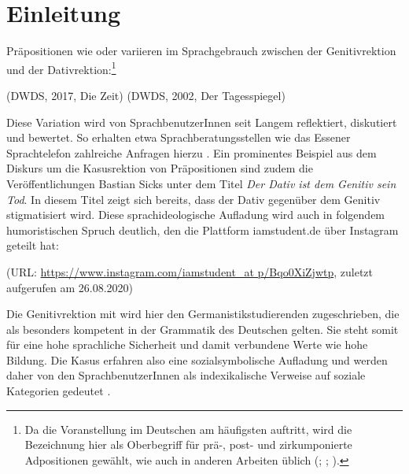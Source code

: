 \chapter{Einleitung}
Präpositionen wie \wegen{} oder \dank{} variieren im Sprachgebrauch zwischen der Genitivrektion und der Dativrektion:\footnote{Da die Voranstellung im Deutschen am häufigsten auftritt, wird die Bezeichnung  hier als Oberbegriff für prä-, post- und zirkumponierte Adpositionen gewählt, wie auch in anderen Arbeiten üblich (\citealp[vgl. etwa][629--630]{Griehaber2009}; \citealp[39]{Romare.2004}; \citealp[356]{Helbig.2017}).} 
\begin{exe}
\ex {} (DWDS, 2017, Die Zeit)
\ex {} (DWDS, 2002, Der Tagesspiegel)
\end{exe}
Diese Variation wird von SprachbenutzerInnen seit Langem reflektiert, diskutiert und bewertet. 
So erhalten etwa Sprachberatungsstellen wie das Essener Sprachtelefon zahlreiche Anfragen hierzu \citep[s.][121]{Bunting1996}. 
Ein prominentes Beispiel aus dem Diskurs um die Kasusrektion von Präpositionen sind zudem die Veröffentlichungen Bastian Sicks unter dem Titel \textit{Der Dativ ist dem Genitiv sein Tod}. 
In diesem Titel zeigt sich bereits, dass der Dativ gegenüber dem Genitiv stigmatisiert wird. 
Diese sprachideologische Aufladung wird auch in folgendem humoristischen Spruch deutlich, den die Plattform iamstudent.de über Instagram geteilt hat:
\begin{exe}
\ex {} (URL: \url{https://www.instagram.com/iamstudent_at p/Bqo0XiZjwtp}, zuletzt aufgerufen am 26.08.2020)
\end{exe}
Die Genitivrektion mit \wegen{} wird hier den Germanistikstudierenden zugeschrieben, die als besonders kompetent in der Grammatik des Deutschen gelten. 
Sie steht somit für eine hohe sprachliche Sicherheit und damit verbundene Werte wie hohe Bildung. 
Die Kasus erfahren also eine sozialsymbolische Aufladung und werden daher von den SprachbenutzerInnen als indexikalische Verweise auf soziale Kategorien gedeutet \citep[s.][]{Silverstein2003}.


